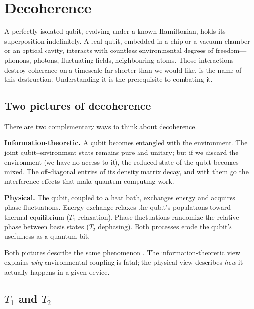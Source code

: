 \chapter{Decoherence}


A perfectly isolated qubit, evolving under a known Hamiltonian, holds its superposition indefinitely. A real qubit, embedded in a chip or a vacuum chamber or an optical cavity, interacts with countless environmental degrees of freedom---phonons, photons, fluctuating fields, neighbouring atoms. Those interactions destroy coherence on a timescale far shorter than we would like.  is the name of this destruction. Understanding it is the prerequisite to combating it.

\section{Two pictures of decoherence}

There are two complementary ways to think about decoherence.

\textbf{Information-theoretic.} A qubit becomes entangled with the environment. The joint qubit--environment state remains pure and unitary; but if we discard the environment (we have no access to it), the reduced state of the qubit becomes mixed. The off-diagonal entries of its density matrix decay, and with them go the interference effects that make quantum computing work.

\textbf{Physical.} The qubit, coupled to a heat bath, exchanges energy and acquires phase fluctuations. Energy exchange relaxes the qubit's populations toward thermal equilibrium ($T_1$ relaxation). Phase fluctuations randomize the relative phase between basis states ($T_2$ dephasing). Both processes erode the qubit's usefulness as a quantum bit.

Both pictures describe the same phenomenon \citep{zurek_decoherence_2003}. The information-theoretic view explains \emph{why} environmental coupling is fatal; the physical view describes \emph{how} it actually happens in a given device.

\section{$T_1$ and $T_2$}

